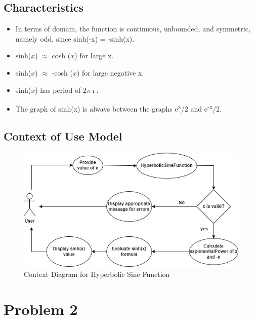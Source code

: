 \documentclass[
	12pt
]{article}
\begin{document}
\subsection{Characteristics}
\begin{itemize}
\item In terms of domain, the function is continuous, unbounded, and symmetric, namely odd, since sinh(-x) = -sinh(x).
\item sinh($x$) $\approx$ cosh ($x$) for large x.
\item sinh($x$) $\approx$  -cosh ($x$) for large negative x.
\item sinh($x$) has period of 2$\pi$$\imath$.
\item The graph of sinh(x) is always between the graphs e\textsuperscript{x}/2  and e\textsuperscript{-x}/2.
\end{itemize}

\subsection{Context of Use Model}
\begin{figure}[htp]
    \centering
    \includegraphics[width=13cm]{context.jpg}
    \caption{Context Diagram for Hyperbolic Sine Function}
    \label{sinh(x) graph}
\end{figure}

\section {Problem 2} 
\end{document}
